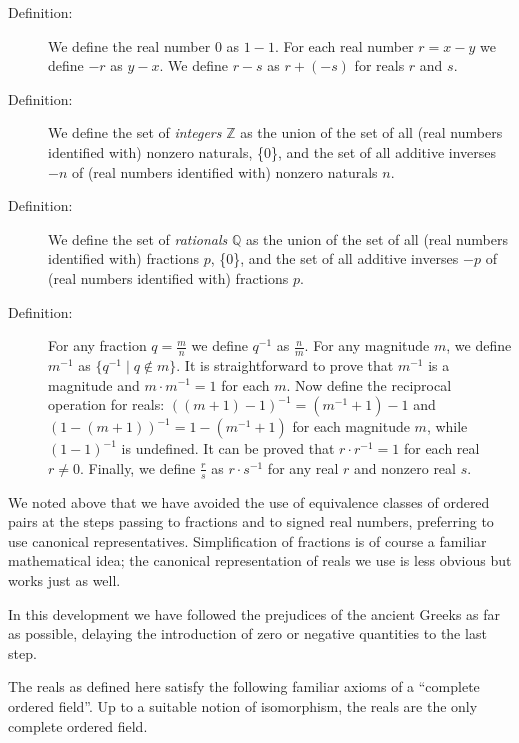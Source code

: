 \documentclass[12pt]{book}
\begin{document}
\begin{description}

\item[Definition:] We define the real number 0 as $1-1$.  For each
real number $r=x-y$ we define $-r$ as $y-x$.  We define $r-s$ as
$r+(-s)$ for reals $r$ and $s$.

\item[Definition:] We define the set of {\em integers\/} ${\mathbb Z}$
as the union of the set of all (real numbers identified with) nonzero
naturals, \{0\}, and the set of all additive inverses $-n$ of (real
numbers identified with) nonzero naturals $n$.

\item[Definition:] We define the set of {\em rationals\/} $\mathbb Q$
as the union of the set of all (real numbers identified with)
fractions $p$, \{0\}, and the set of all additive inverses $-p$ of
(real numbers identified with) fractions $p$.

\item[Definition:] For any fraction $q = \frac mn$ we define $q^{-1}$
as $\frac nm$.  For any magnitude $m$, we define $m^{-1}$ as $\{q^{-1}
\mid q \not\in m\}$.  It is straightforward to prove that $m^{-1}$ is
a magnitude and $m \cdot m^{-1} = 1$ for each $m$.  Now define the
reciprocal operation for reals: $((m+1)-1)^{-1} = (m^{-1}+1)-1$ and
$(1-(m+1))^{-1} = 1-(m^{-1}+1)$ for each magnitude $m$, while
$(1-1)^{-1}$ is undefined.  It can be proved that $r \cdot r^{-1}=1$
for each real $r \neq 0$.  Finally, we define $\frac rs$ as $r \cdot
s^{-1}$ for any real $r$ and nonzero real $s$.

\end{description}

We noted above that we have avoided the use of equivalence classes of
ordered pairs at the steps passing to fractions and to signed real
numbers, preferring to use canonical representatives.  Simplification
of fractions is of course a familiar mathematical idea; the canonical
representation of reals we use is less obvious but works just as well.

In this development we have followed the prejudices of the ancient
Greeks as far as possible, delaying the introduction of zero or
negative quantities to the last step.

\newpage

The reals as defined here satisfy the following familiar axioms of a
``complete ordered field''.  Up to a suitable notion of isomorphism,
the reals are the only complete ordered field.
\end{document}
